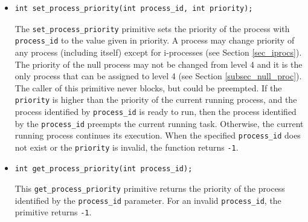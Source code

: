   \begin{itemize}[]
    \item[]{}
\begin{lstlisting}
int set_process_priority(int process_id, int priority);
\end{lstlisting}
      The \verb+set_process_priority+ primitive sets the priority of the process with \verb+process_id+ to the value given in priority. A process may change priority of any process (including itself) except for i-processes (see Section \ref{sec_iprocs}). The priority of the null process may not be changed from level 4 and it is the only process that can be assigned to level 4 (see Section \ref{subsec_null_proc}). The caller of this primitive never blocks, but could be preempted. If the \verb+priority+ is higher than the priority of the current running process, and the process identified by \verb+process_id+ is ready to run, then the process identified by the \verb+process_id+ preempts the current running task. Otherwise, the current running process continues its execution. When the specified \verb+process_id+ does not exist or the \verb+priority+ is invalid, the function returns \verb+-1+. \\ 
    \item[]{}
\begin{lstlisting}
int get_process_priority(int process_id);
\end{lstlisting}
      This \verb+get_process_priority+ primitive returns the priority of the process identified by the \verb+process_id+ parameter. For an invalid \verb+process_id+, the primitive returns \verb+-1+.

  \end{itemize}
